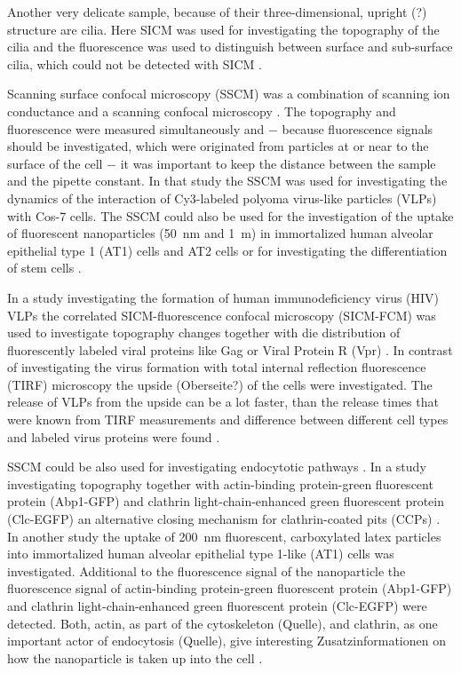 Another very delicate sample, because of their three-dimensional, upright (?) structure are cilia.
Here SICM was used for investigating the topography of the cilia and the fluorescence was used to
distinguish between surface and sub-surface cilia, which could not be detected with SICM 
\cite{Zhou2018}.

Scanning surface confocal microscopy (SSCM) was a combination of scanning ion conductance and a 
scanning confocal microscopy \cite{Gorelik2002}. The topography and fluorescence were measured
simultaneously and $-$ because fluorescence signals should be investigated, which were originated
from particles at or near to the surface of the cell $-$ it was important to keep the distance 
between the sample and the pipette constant. In that study the SSCM was used for investigating the 
dynamics of the interaction of Cy3-labeled polyoma virus-like particles (VLPs) with Cos-7 cells. 
The SSCM could also be used for the investigation of the uptake of fluorescent nanoparticles 
(50~nm and 1~{\textmu}m) in immortalized human alveolar epithelial type 1 (AT1) cells and AT2 
cells \cite{Kemp2008} or for investigating the differentiation of stem cells \cite{Gorelik2008}.

In a study investigating the formation of human immunodeficiency virus (HIV) VLPs the correlated
SICM-fluorescence confocal microscopy (SICM-FCM) was used to investigate topography changes
together with die distribution of fluorescently labeled viral proteins like Gag or Viral Protein R 
(Vpr) \cite{Bednarska2020}. In contrast of investigating the virus formation with total internal 
reflection fluorescence (TIRF) microscopy \cite{Jouvenet2008} the upside (Oberseite?) of the cells 
were investigated. The release of VLPs from the upside can be a lot faster, than the release times 
that were known from TIRF measurements and difference between different cell types and labeled 
virus proteins were found \cite{Bednarska2020}. 

SSCM could be also used for investigating endocytotic pathways \cite{Shevchuk2008}. In a study 
investigating topography together with actin-binding protein-green fluorescent protein (Abp1-GFP)
and clathrin light-chain-enhanced green fluorescent protein (Clc-EGFP) an alternative closing 
mechanism for clathrin-coated pits (CCPs) \cite{Shevchuk2012}. In another study the uptake of
200~nm fluorescent, carboxylated latex particles into immortalized human alveolar epithelial type
1-like (AT1) cells was investigated. Additional to the fluorescence signal of the nanoparticle the 
fluorescence signal of actin-binding protein-green fluorescent protein (Abp1-GFP) and clathrin
light-chain-enhanced green fluorescent protein (Clc-EGFP) were detected. Both, actin, as part of
the cytoskeleton (Quelle), and clathrin, as one important actor of endocytosis (Quelle), give 
interesting Zusatzinformationen on how the nanoparticle is taken up into the cell 
\cite{Novak2014}. 

